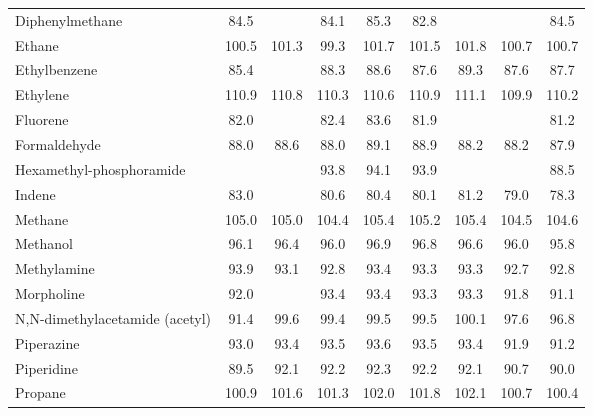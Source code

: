 \begin{longtable}{m{3.1cm} | c c c c c c c c}
Diphenylmethane                  &  84.5     &          &   84.1   &    85.3     &    82.8    &          &         &    84.5   \\
Ethane                           & 100.5     &  101.3   &   99.3   &   101.7     &   101.5    &  101.8   & 100.7   &   100.7   \\
Ethylbenzene                     &  85.4     &          &   88.3   &    88.6     &    87.6    &   89.3   &  87.6   &    87.7   \\
Ethylene                         & 110.9     &  110.8   &  110.3   &   110.6     &   110.9    &  111.1   & 109.9   &   110.2   \\
Fluorene                         &  82.0     &          &   82.4   &    83.6     &    81.9    &          &         &    81.2   \\
Formaldehyde                     &  88.0     &   88.6   &   88.0   &    89.1     &    88.9    &   88.2   &  88.2   &    87.9   \\
Hexamethyl-phosphoramide         &           &          &   93.8   &    94.1     &    93.9    &          &         &    88.5   \\
Indene                           &  83.0     &          &   80.6   &    80.4     &    80.1    &   81.2   &  79.0   &    78.3   \\
Methane                          & 105.0     &  105.0   &  104.4   &   105.4     &   105.2    &  105.4   & 104.5   &   104.6   \\
Methanol                         &  96.1     &   96.4   &   96.0   &    96.9     &    96.8    &   96.6   &  96.0   &    95.8   \\
Methylamine                      &  93.9     &   93.1   &   92.8   &    93.4     &    93.3    &   93.3   &  92.7   &    92.8   \\
Morpholine                       &  92.0     &          &   93.4   &    93.4     &    93.3    &   93.3   &  91.8   &    91.1   \\
N,N-dimethylacetamide (acetyl)   &  91.4     &   99.6   &   99.4   &    99.5     &    99.5    &  100.1   &  97.6   &    96.8   \\
Piperazine                       &  93.0     &   93.4   &   93.5   &    93.6     &    93.5    &   93.4   &  91.9   &    91.2   \\
Piperidine                       &  89.5     &   92.1   &   92.2   &    92.3     &    92.2    &   92.1   &  90.7   &    90.0   \\
Propane                          & 100.9     &  101.6   &  101.3   &   102.0     &   101.8    &  102.1   & 100.7   &   100.4   \\

\end{longtable}
